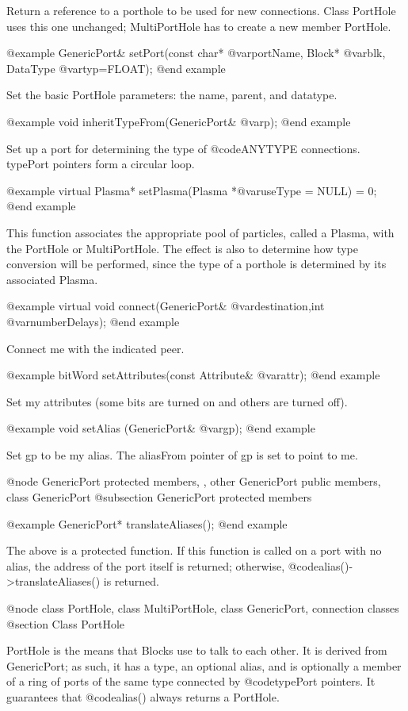 Return a reference to a porthole to be used for new connections.
Class PortHole uses this one unchanged; MultiPortHole has to create
a new member PortHole.

@example
GenericPort& setPort(const char* @var{portName}, Block* @var{blk}, DataType @var{typ}=FLOAT);
@end example

Set the basic PortHole parameters: the name, parent, and datatype.

@example
void inheritTypeFrom(GenericPort& @var{p});
@end example

Set up a port for determining the type of @code{ANYTYPE} connections.
typePort pointers form a circular loop.

@example
virtual Plasma* setPlasma(Plasma *@var{useType} = NULL) = 0;
@end example

This function associates the appropriate pool of particles, called a
Plasma, with the PortHole or MultiPortHole.  The effect is also to
determine how type conversion will be performed, since the type of
a porthole is determined by its associated Plasma.

@example
virtual void connect(GenericPort& @var{destination},int @var{numberDelays});
@end example

Connect me with the indicated peer.

@example
bitWord setAttributes(const Attribute& @var{attr});
@end example

Set my attributes (some bits are turned on and others are turned off).

@example
void setAlias (GenericPort& @var{gp});
@end example

Set gp to be my alias.  The aliasFrom pointer of gp is set to
point to me.

@node GenericPort protected members,  , other GenericPort public members, class GenericPort
@subsection GenericPort protected members

@example
GenericPort* translateAliases();
@end example

The above is a protected function.  If this function is called on
a port with no alias, the address of the port itself is returned;
otherwise, @code{alias()->translateAliases()} is returned.

@node class PortHole, class MultiPortHole, class GenericPort, connection classes
@section Class PortHole

PortHole is the means that Blocks use to talk to each other.  It is
derived from GenericPort; as such, it has a type, an optional alias,
and is optionally a member of a ring of ports of the same type connected
by @code{typePort} pointers.  It guarantees that @code{alias()} always
returns a PortHole.

